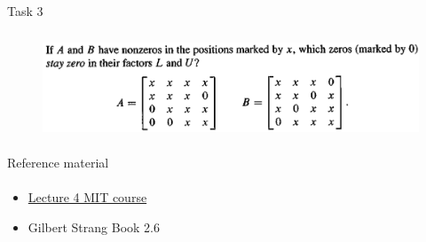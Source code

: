 \documentclass[aspectratio=169]{beamer}
\newcommand{\fbckg}[1]{\usebackgroundtemplate{\texttt{[image: \#1]}}}%
\begin{document}
\begin{frame}[t]{Task 3}
    \framesubtitle{}
    \begin{figure}[H]
        \centering\includegraphics[height=3cm,width=1\textwidth,keepaspectratio]{3.png}
        \label{fig:1.png}
    \end{figure}
\end{frame}

\begin{frame}[t]{Reference material}
    \framesubtitle{}
    \Large
    \begin{itemize}
        \item \href{https://ocw.mit.edu/courses/mathematics/18-06-linear-algebra-spring-2010/video-lectures/lecture-4-factorization-into-a-lu/}{Lecture 4 MIT course}
        \item Gilbert Strang Book 2.6
    \end{itemize}
\end{frame}

\fbckg{fibeamer/figs/last_page.png}
\frame[plain]{}
\end{document}
